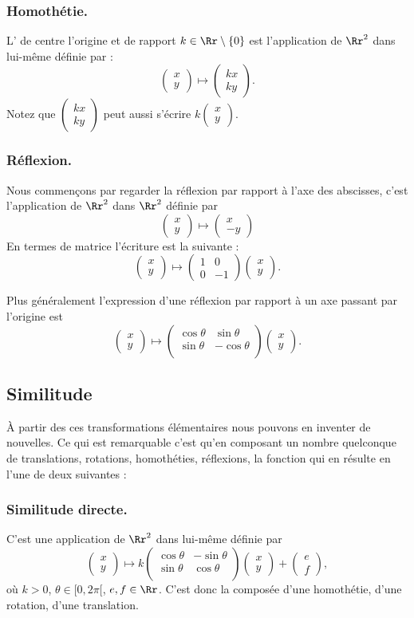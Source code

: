 \documentclass[11pt,class=report,crop=false]{standalone}
\newcommand{\myvec}[2]{\begin{pmatrix}#1 \\ #2\end{pmatrix}}
\newcommand{\commentfigure}[1]{#1} %
\begin{document}
\subsubsection*{Homothétie.}
L' de centre l'origine et de rapport $k \in \Rr\setminus\{0\}$ est l'application 
de $\Rr^2$ dans lui-même définie par :
$$\myvec{x}{y} \mapsto \myvec{kx}{ky}.$$
Notez que $\myvec{kx}{ky}$ peut aussi s'écrire $k\myvec{x}{y}$.


\subsubsection*{Réflexion.}
Nous commençons par regarder la réflexion par rapport à l'axe des abscisses,
c'est l'application de $\Rr^2$ dans $\Rr^2$ définie par
$$\myvec{x}{y} \mapsto \myvec{x}{-y}$$
En termes de matrice l'écriture est la suivante :
$$\myvec{x}{y} \mapsto \begin{pmatrix}1 & 0 \\ 0 & -1\end{pmatrix}\myvec{x}{y}.$$

Plus généralement l'expression d'une réflexion par rapport à un axe passant par l'origine est
$$\myvec{x}{y} \mapsto \begin{pmatrix}\cos \theta & \sin \theta \\ 
\sin\theta & -\cos \theta\\ \end{pmatrix}\myvec{x}{y}.$$



\subsection{Similitude}

\`A partir des ces transformations élémentaires nous pouvons en inventer de nouvelles.
Ce qui est remarquable c'est qu'en composant un nombre quelconque de translations,
rotations, homothéties, réflexions, la fonction qui en résulte en l'une de deux suivantes :

\subsubsection*{Similitude directe.}
C'est une application de $\Rr^2$ dans lui-même définie 
par
$$\myvec{x}{y} \mapsto k\begin{pmatrix}\cos \theta & -\sin \theta \\ 
\sin\theta & \cos \theta\\ \end{pmatrix}\myvec{x}{y} + \myvec{e}{f},$$
où $k > 0$, $\theta \in[0,2\pi[$, $e, f \in \Rr$.
C'est donc la composée d'une homothétie, d'une rotation, d'une translation.
\end{document}
